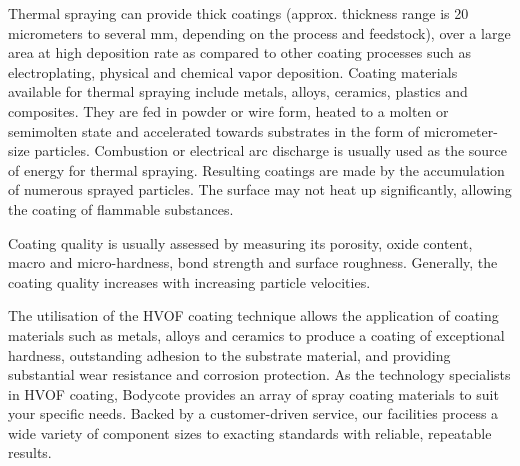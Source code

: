 Thermal spraying can provide thick coatings (approx. thickness range is 20
micrometers to several mm, depending on the process and feedstock), over a
large area at high deposition rate as compared to other coating processes such
as electroplating, physical and chemical vapor deposition. Coating materials
available for thermal spraying include metals, alloys, ceramics, plastics and
composites. They are fed in powder or wire form, heated to a molten or
semimolten state and accelerated towards substrates in the form of
micrometer-size particles. Combustion or electrical arc discharge is usually
used as the source of energy for thermal spraying. Resulting coatings are made
by the accumulation of numerous sprayed particles. The surface may not heat up
significantly, allowing the coating of flammable substances.

Coating quality is usually assessed by measuring its porosity, oxide content,
macro and micro-hardness, bond strength and surface roughness. Generally, the
coating quality increases with increasing particle velocities.

The utilisation of the HVOF coating technique allows the application of coating
materials such as metals, alloys and ceramics to produce a coating of
exceptional hardness, outstanding adhesion to the substrate material, and
providing substantial wear resistance and corrosion protection.
As the technology specialists in HVOF coating, Bodycote provides an array of
spray coating materials to suit your specific needs. Backed by a
customer-driven service, our facilities process a wide variety of component
sizes to exacting standards with reliable, repeatable results.

